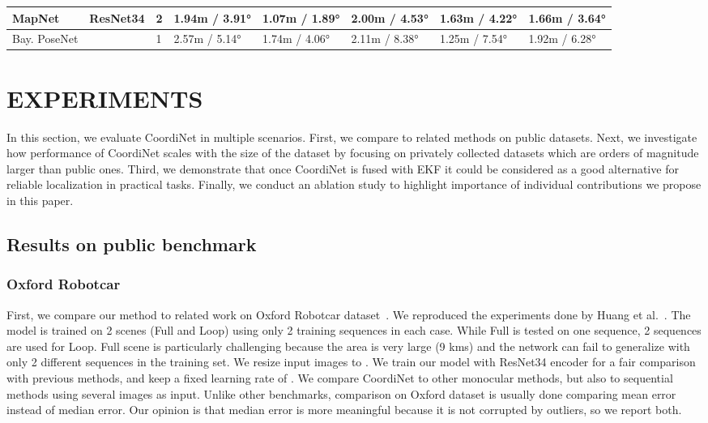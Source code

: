 \documentclass[10pt,twocolumn,letterpaper]{article}
\begin{document}
\begin{table*}[!t]
\begin{tabular}{|l|l|l|l|l|l|l|l|}
MapNet             & ResNet34          & 2              & 1.94m / 3.91°                              & 1.07m / 1.89°                         & 2.00m / 4.53°                         & 1.63m / 4.22°                         & 1.66m / 3.64°                         \\ \hline
Bay. PoseNet       &                   & 1              & 2.57m / 5.14°                              & 1.74m / 4.06°                         & 2.11m / 8.38°                         & 1.25m / 7.54°                         & 1.92m / 6.28°                         \\ \hline
\end{tabular}
\end{table*} 
\section{EXPERIMENTS}
\label{sec:results}

In this section, we evaluate CoordiNet in multiple scenarios. First, we compare to related methods on public datasets. Next, we investigate how performance of CoordiNet scales with the size of the dataset by focusing on privately collected datasets which are orders of magnitude larger than public ones. Third, we demonstrate that once CoordiNet is fused with EKF it could be considered as a good alternative for reliable localization in practical tasks. Finally, we conduct an ablation study to highlight importance of individual contributions we propose in this paper.


\subsection{Results on public benchmark}

\subsubsection{Oxford Robotcar}

First, we compare our method to related work on Oxford Robotcar dataset~\cite{RobotCarDatasetIJRR}. We reproduced the experiments done by Huang et al.~\cite{RVL}. The model is trained on 2 scenes (Full and Loop) using only 2 training sequences in each case. While Full is tested on one sequence, 2 sequences are used for Loop. Full scene is particularly challenging because the area is very large (9 kms) and the network can fail to generalize with only 2 different sequences in the training set. We resize input images to . We train our model with ResNet34 encoder for a fair comparison with previous methods, and keep a fixed learning rate of . We compare CoordiNet to other monocular methods, but also to sequential methods using several images as input. Unlike other benchmarks, comparison on Oxford dataset is usually done comparing mean error instead of median error. Our opinion is that median error is more meaningful because it is not corrupted by outliers, so we report both.
\end{document}
